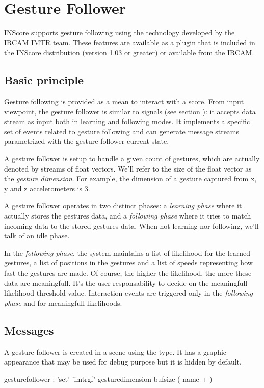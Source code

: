 \documentclass[a4paper,twoside]{report}
\newcommand{\sublevel}[1]	{\section{#1}}
\newcommand{\subsublevel}[1]	{\subsection{#1}}
\begin{document}
\sublevel{Gesture Follower}
\label{GF}

INScore supports gesture following using the technology developed by the IRCAM IMTR team. These features are available as a plugin that is included in the INScore distribution (version 1.03 or greater) or available from the IRCAM.

\subsublevel{Basic principle}
\label{gfbasic}
Gesture following is provided as a mean to interact with a score. From input viewpoint, the gesture follower is similar to signals (see section ): it accepts data stream as input both in learning and following modes. It implements a specific set of events related to gesture following and can generate message streams parametrized with the gesture follower current state.

A gesture follower is setup to handle a given count of gestures, which are actually denoted by streams of float vectors. We'll refer to the size of the float vector as the \emph{gesture dimension}. For example, the dimension of a gesture captured from x, y and z accelerometers is 3.

A gesture follower operates in two distinct phases: a \emph{learning phase} where it actually stores the gestures data, and a \emph{following phase} where it tries to match incoming data to the stored gestures data. When not learning nor following, we'll talk of an idle phase. 

In the \emph{following phase}, the system maintains a list of likelihood for the learned gestures, a list of positions in the gestures and a list of speeds representing how fast the gestures are made. Of course, the higher the likelihood, the more these data are meaningfull. It's the user responsability to decide on the meaningfull likelihood threshold value. Interaction events are triggered only in the \emph{following phase} and for meaningfull likelihoods.

\subsublevel{Messages}
\label{gfmessages}
A gesture follower is created in a scene using the  type. It has a graphic appearance that may be used for debug purpose but it is hidden by default.


\begin{rail}
gesturefollower : 'set' 'imtrgf' gesturedimension bufsize ( name + )
\end{rail}
\end{document}

